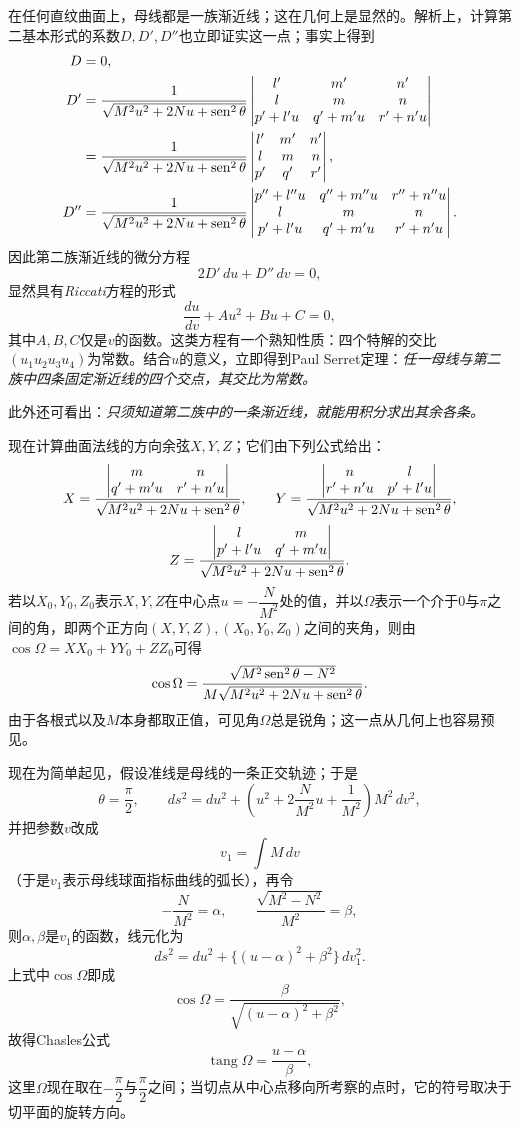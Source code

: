 在任何直纹曲面上，母线都是一族渐近线；这在几何上是显然的。解析上，计算第二基本形式的系数\(D,D',D''\)也立即证实这一点；事实上得到
\[
\begin{aligned}
D&=0,\\
D'&=\frac1{\sqrt{M^2u^2+2Nu+\operatorname{sen}^2\theta}}
\left|\begin{matrix}l'&m'&n'\\ l&m&n\\ p'+l'u&q'+m'u&r'+n'u\end{matrix}\right|\\
&=\frac1{\sqrt{M^2u^2+2Nu+\operatorname{sen}^2\theta}}
\left|\begin{matrix}l'&m'&n'\\ l&m&n\\ p'&q'&r'\end{matrix}\right|,\\
D''&=\frac1{\sqrt{M^2u^2+2Nu+\operatorname{sen}^2\theta}}
\left|\begin{matrix}p''+l''u&q''+m''u&r''+n''u\\ l&m&n\\ p'+l'u&q'+m'u&r'+n'u\end{matrix}\right|.
\end{aligned}
\]
因此第二族渐近线的微分方程
\[
 2D'\,du+D''\,dv=0,
\]
显然具有\emph{Riccati}方程的形式
\[
 \frac{du}{dv}+Au^2+Bu+C=0,
\]
其中\(A,B,C\)仅是\(v\)的函数。这类方程有一个熟知性质：四个特解的交比\((u_1u_2u_3u_4)\)为常数。结合\(u\)的意义，立即得到Paul Serret定理：\emph{任一母线与第二族中四条固定渐近线的四个交点，其交比为常数。}

此外还可看出：\emph{只须知道第二族中的一条渐近线，就能用积分求出其余各条。}

现在计算曲面法线的方向余弦\(X,Y,Z\)；它们由下列公式给出：
\[
 X=\frac{\left|\begin{matrix}m&n\\ q'+m'u&r'+n'u\end{matrix}\right|}{\sqrt{M^2u^2+2Nu+\operatorname{sen}^2\theta}},
 \qquad
 Y=\frac{\left|\begin{matrix}n&l\\ r'+n'u&p'+l'u\end{matrix}\right|}{\sqrt{M^2u^2+2Nu+\operatorname{sen}^2\theta}},
\]
\[
 Z=\frac{\left|\begin{matrix}l&m\\ p'+l'u&q'+m'u\end{matrix}\right|}{\sqrt{M^2u^2+2Nu+\operatorname{sen}^2\theta}}.
\]
若以\(X_0,Y_0,Z_0\)表示\(X,Y,Z\)在中心点\(u=-\dfrac{N}{M^2}\)处的值，并以\(\Omega\)表示一个介于0与\(\pi\)之间的角，即两个正方向\((X,Y,Z),(X_0,Y_0,Z_0)\)之间的夹角，则由\(\cos\Omega=XX_0+YY_0+ZZ_0\)可得
\[
 \cos\Omega=\frac{\sqrt{M^2\operatorname{sen}^2\theta-N^2}}{M\sqrt{M^2u^2+2Nu+\operatorname{sen}^2\theta}}.
\]
由于各根式以及\(M\)本身都取正值，可见角\(\Omega\)总是锐角；这一点从几何上也容易预见。

现在为简单起见，假设准线是母线的一条正交轨迹；于是
\[
 \theta=\frac\pi2,
 \qquad
 ds^2=du^2+\left(u^2+2\frac{N}{M^2}u+\frac1{M^2}\right)M^2\,dv^2,
\]
并把参数\(v\)改成
\[
 v_1=\int M\,dv
\]
（于是\(v_1\)表示母线球面指标曲线的弧长），再令
\[
 -\frac{N}{M^2}=\alpha,
 \qquad
 \frac{\sqrt{M^2-N^2}}{M^2}=\beta,
\]
则\(\alpha,\beta\)是\(v_1\)的函数，线元化为
\begin{equation}\tag{8}
 ds^2=du^2+\{(u-\alpha)^2+\beta^2\}\,dv_1^2.
\end{equation}
上式中\(\cos\Omega\)即成
\[
 \cos\Omega=\frac{\beta}{\sqrt{(u-\alpha)^2+\beta^2}},
\]
故得Chasles公式
\begin{equation}\tag{9}
 \operatorname{tang}\Omega=\frac{u-\alpha}{\beta},
\end{equation}
这里\(\Omega\)现在取在\(-\dfrac\pi2\)与\(\dfrac\pi2\)之间；当切点从中心点移向所考察的点时，它的符号取决于切平面的旋转方向。

